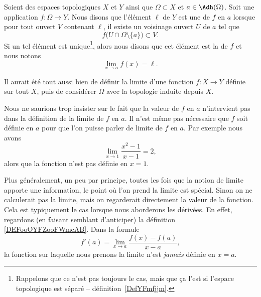 \begin{definition}\label{DefYNVoWBx}
	Soient des espaces topologiques \( X\) et \( Y\) ainsi que \( \Omega\subset X\) et \( a\in \Adh(\Omega)\). Soit une application \( f\colon \Omega\to Y\). Nous disons que l'élément \( \ell\) de \( Y\) est une  de \( f\) en \( a\) lorsque pour tout ouvert \( V\) contenant \( \ell\), il existe un voisinage ouvert \( U\) de \( a\) tel que
	\begin{equation}        \label{EQooXLJJooZDcOtU}
		f\big( U\cap\Omega\setminus\{ a \} \big)\subset V.
	\end{equation}
	Si un tel élément est unique\footnote{Rappelons que ce n'est pas toujours le cas, mais que ça l'est si l'espace topologique est séparé -- définition~\ref{DefYFmfjjm}.}, alors nous disons que cet élément est la  de \( f\) et nous notons
	\begin{equation}
		\lim_{x\to a} f(x)=\ell.
	\end{equation}
\end{definition}

\begin{normaltext}
	Il aurait été tout aussi bien de définir la limite d'une fonction \( f\colon X\to Y\) définie sur tout \( X\), puis de considérer \( \Omega\) avec la topologie induite depuis \( X\).
\end{normaltext}

\begin{remark}
	Nous ne saurions trop insister sur le fait que la valeur de \( f\) en \( a\) n'intervient pas dans la définition de la limite de \( f\) en \( a\). Il n'est même pas nécessaire que \( f\) soit définie en \( a\) pour que l'on puisse parler de limite de \( f\) en \( a\). Par exemple nous avons
	\begin{equation}
		\lim_{x\to 1} \frac{ x^2-1 }{ x-1 }=2,
	\end{equation}
	alors que la fonction n'est pas définie en \( x=1\).

	Plus généralement, un peu par principe, toutes les fois que la notion de limite apporte une information, le point où l'on prend la limite est spécial. Sinon on ne calculerait pas la limite, mais on regarderait directement la valeur de la fonction. Cela est typiquement le cas lorsque nous aborderons les dérivées. En effet, regardons (en faisant semblant d'anticiper) la définition  \eqref{DEFooOYFZooFWmcAB}. Dans la formule
	\begin{equation}
		f'(a)=\lim_{x\to a} \frac{ f(x)-f(a) }{ x-a },
	\end{equation}
	la fonction sur laquelle nous prenons la limite n'est \emph{jamais} définie en \( x=a\).
\end{remark}

